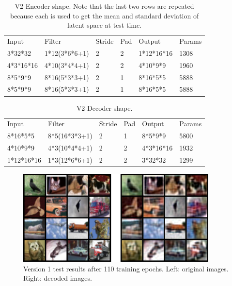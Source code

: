 \documentclass[10pt]{article}
\begin{document}
\begin{table}
\begin{tabular}{|l|l|l|l|l|l|}
Input & Filter & Stride & Pad & Output & Params\\
3*32*32		&1*12(3*6*6+1)		&2	&2	&1*12*16*16	&1308\\
4*3*16*16	&4*10(3*4*4+1)		&2	&2	&4*10*9*9	&1960\\
8*5*9*9		&8*16(5*3*3+1)		&2	&1	&8*16*5*5	&5888\\
8*5*9*9		&8*16(5*3*3+1)		&2	&1	&8*16*5*5	&5888\\
\end{tabular}
\caption{\label{tab:table-name}V2 Encoder shape. Note that the last two rows are repeated because each is used to get the mean and standard deviation of latent space at test time.}
\end{table}

\begin{table}
\begin{tabular}{|l|l|l|l|l|l|}
Input & Filter & Stride & Pad & Output & Params\\
8*16*5*5	&8*5(16*3*3+1)		&2	&1&	8*5*9*9		&5800\\
4*10*9*9	&4*3(10*4*4+1)		&2	&2	&4*3*16*16	&1932\\
1*12*16*16	&1*3(12*6*6+1)		&2	&2	&3*32*32		&1299\\
\end{tabular}
\caption{\label{tab:table-name}V2 Decoder shape.}
\end{table}

\begin{center}
\begin{figure}
\caption{Version 1 test results after 110 training epochs. Left: original images. Right: decoded images.}
\includegraphics[width=0.9\textwidth]{20220530 1 v1.PNG}
\end{figure}
\end{center}
\end{document}

